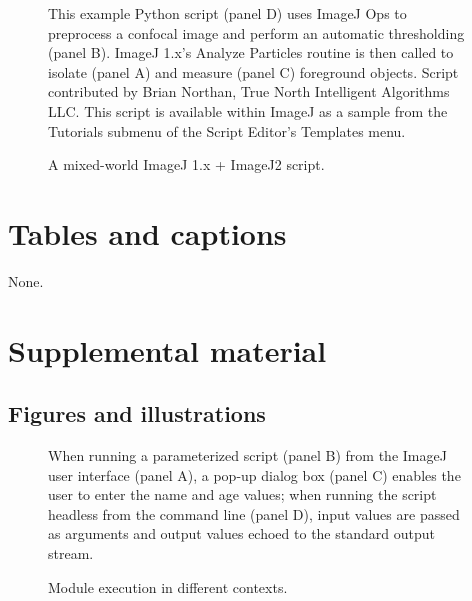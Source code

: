 \documentclass{bmcart}
\begin{document}
\begin{backmatter}
  \begin{figure}[h!]
    \caption{A mixed-world ImageJ 1.x + ImageJ2 script.}
    \begin{flushleft}
      This example Python script (panel D) uses ImageJ Ops to preprocess a
      confocal image and perform an automatic thresholding (panel B). ImageJ
      1.x's Analyze Particles routine is then called to isolate (panel A) and
      measure (panel C) foreground objects. Script contributed by Brian
      Northan, True North Intelligent Algorithms LLC. This script is available
      within ImageJ as a sample from the Tutorials submenu of the Script
      Editor's Templates menu.
    \end{flushleft}
  \end{figure}

\FloatBarrier


\section*{Tables and captions}
  None.

\section*{Supplemental material}

\subsection*{Figures and illustrations}
  \renewcommand\thefigure{S.\arabic{figure}}
  \setcounter{figure}{0}

  \begin{figure}[h!]
    \caption{Module execution in different contexts.}
    \begin{flushleft}
      When running a parameterized script (panel B) from the ImageJ user
      interface (panel A), a pop-up dialog box (panel C) enables the user to
      enter the name and age values; when running the script headless from the
      command line (panel D), input values are passed as arguments and output
      values echoed to the standard output stream.
    \end{flushleft}
  \end{figure}


\end{backmatter}
\end{document}
